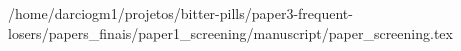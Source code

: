 /home/darciogm1/projetos/bitter-pills/paper3-frequent-losers/papers_finais/paper1_screening/manuscript/paper_screening.tex